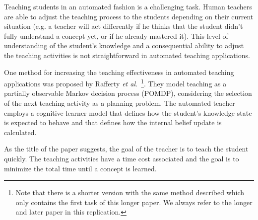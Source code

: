 
Teaching students in an automated fashion is a challenging task. Human teachers are able to adjust the teaching process to the students depending on their current situation (e.g. a teacher will act differently if he thinks that the student didn't fully understand a concept yet, or if he already mastered it). This level of understanding of the student's knowledge and a consequential ability to adjust the teaching activities is not straightforward in automated teaching applications.

One method for increasing the teaching effectiveness in automated teaching applications was proposed by Rafferty \textit{et al.}~\cite{rafferty2016faster}\footnote{Note that there is a shorter version with the same method described which only contains the first task of this longer paper. We always refer to the longer and later paper in this replication.}. They model teaching as a partially observable Markov decision process (POMDP), considering the selection of the next teaching activity as a planning problem. The automated teacher employs a cognitive learner model that defines how the student's knowledge state is expected to behave and that defines how the internal belief update is calculated.

As the title of the paper suggests, the goal of the teacher is to teach the student quickly. The teaching activities have a time cost associated and the goal is to minimize the total time until a concept is learned. 

